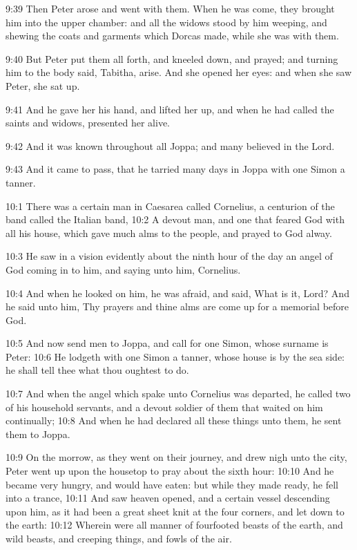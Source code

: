 9:39 Then Peter arose and went with them. When he was come, they brought him into the upper chamber: and all the widows stood by him weeping, and shewing the coats and garments which Dorcas made, while she was with them.

9:40 But Peter put them all forth, and kneeled down, and prayed; and turning him to the body said, Tabitha, arise. And she opened her eyes: and when she saw Peter, she sat up.

9:41 And he gave her his hand, and lifted her up, and when he had called the saints and widows, presented her alive.

9:42 And it was known throughout all Joppa; and many believed in the Lord.

9:43 And it came to pass, that he tarried many days in Joppa with one Simon a tanner.

10:1 There was a certain man in Caesarea called Cornelius, a centurion of the band called the Italian band, 10:2 A devout man, and one that feared God with all his house, which gave much alms to the people, and prayed to God alway.

10:3 He saw in a vision evidently about the ninth hour of the day an angel of God coming in to him, and saying unto him, Cornelius.

10:4 And when he looked on him, he was afraid, and said, What is it, Lord?  And he said unto him, Thy prayers and thine alms are come up for a memorial before God.

10:5 And now send men to Joppa, and call for one Simon, whose surname is Peter: 10:6 He lodgeth with one Simon a tanner, whose house is by the sea side: he shall tell thee what thou oughtest to do.

10:7 And when the angel which spake unto Cornelius was departed, he called two of his household servants, and a devout soldier of them that waited on him continually; 10:8 And when he had declared all these things unto them, he sent them to Joppa.

10:9 On the morrow, as they went on their journey, and drew nigh unto the city, Peter went up upon the housetop to pray about the sixth hour: 10:10 And he became very hungry, and would have eaten: but while they made ready, he fell into a trance, 10:11 And saw heaven opened, and a certain vessel descending upon him, as it had been a great sheet knit at the four corners, and let down to the earth: 10:12 Wherein were all manner of fourfooted beasts of the earth, and wild beasts, and creeping things, and fowls of the air.

